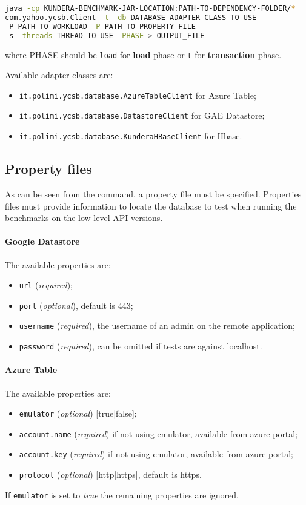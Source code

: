 \begin{lstlisting}[language=bash, caption=Run low-level API benchmarks, numbers=none]
java -cp KUNDERA-BENCHMARK-JAR-LOCATION:PATH-TO-DEPENDENCY-FOLDER/*
com.yahoo.ycsb.Client -t -db DATABASE-ADAPTER-CLASS-TO-USE
-P PATH-TO-WORKLOAD -P PATH-TO-PROPERTY-FILE 
-s -threads THREAD-TO-USE -PHASE > OUTPUT_FILE
\end{lstlisting}

\noindent where PHASE should be \texttt{load} for \textbf{load} phase or \texttt{t} for \textbf{transaction} phase.

\newparagraph  Available adapter classes are:
\begin{itemize}
\item \texttt{it.polimi.ycsb.database.AzureTableClient} for Azure Table;
\item \texttt{it.polimi.ycsb.database.DatastoreClient} for GAE Datastore;
\item \texttt{it.polimi.ycsb.database.KunderaHBaseClient} for Hbase.
\end{itemize}

\subsection{Property files}
As can be seen from the command, a property file must be specified. Properties files must provide information to locate the database to test when running the benchmarks on the low-level API versions.

\paragraph{Google Datastore} The available properties are:
\begin{itemize}
\item \texttt{url} (\textit{required});
\item \texttt{port} (\textit{optional}), default is 443;
\item \texttt{username} (\textit{required}), the username of an admin on the remote application;
\item \texttt{password} (\textit{required}), can be omitted if tests are against localhost.
\end{itemize}

\paragraph{Azure Table} The available properties are:
\begin{itemize}
\item \texttt{emulator} (\textit{optional}) [true|false];
\item \texttt{account.name} (\textit{required}) if not using emulator, available from azure portal;
\item \texttt{account.key} (\textit{required}) if not using emulator, available from azure portal;
\item \texttt{protocol} (\textit{optional}) [http|https], default is https.
\end{itemize}
\noindent If \texttt{emulator} is set to \textit{true} the remaining properties are ignored.

